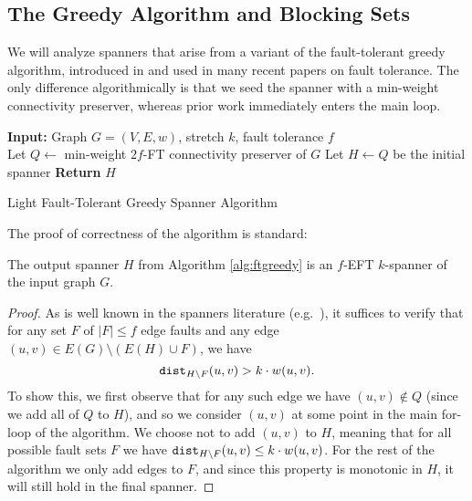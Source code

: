 \subsection{The Greedy Algorithm and Blocking Sets}

We will analyze spanners that arise from a variant of the fault-tolerant greedy algorithm, introduced in \cite{BDPV18} and used in many recent papers on fault tolerance.
The only difference algorithmically is that we seed the spanner with a min-weight connectivity preserver, whereas prior work immediately enters the main loop.

\begin{algorithm}
\DontPrintSemicolon

\textbf{Input:} Graph $G = (V, E, w)$, stretch $k$, fault tolerance $f$\;~\\

Let $Q \gets $ min-weight $2f$-FT connectivity preserver of $G$\;
Let $H \gets Q$ be the initial spanner\;
\textbf{Return} $H$\;
\caption{\label{alg:ftgreedy} Light Fault-Tolerant Greedy Spanner Algorithm}
\end{algorithm}

The proof of correctness of the algorithm is standard:
\begin{theorem} \label{thm:feasible}
The output spanner $H$ from Algorithm \ref{alg:ftgreedy} is an $f$-EFT $k$-spanner of the input graph $G$.
\end{theorem}
\begin{proof}
As is well known in the spanners literature (e.g.~\cite{ADDJS93}), it suffices to verify that for any set $F$ of $|F| \le f$ edge faults and any edge $(u, v) \in E(G) \setminus (E(H) \cup F)$, we have
$$\texttt{dist}_{H \setminus F}(u, v) > k \cdot w(u, v).$$
To show this, we first observe that for any such edge we have $(u, v) \notin Q$ (since we add all of $Q$ to $H$), and so we consider $(u, v)$ at some point in the main for-loop of the algorithm.
We choose not to add $(u, v)$ to $H$, meaning that for all possible fault sets $F$ we have $\texttt{dist}_{H \setminus F}(u, v) \le k \cdot w(u, v)$.
For the rest of the algorithm we only add edges to $F$, and since this property is monotonic in $H$, it will still hold in the final spanner.
\end{proof}

